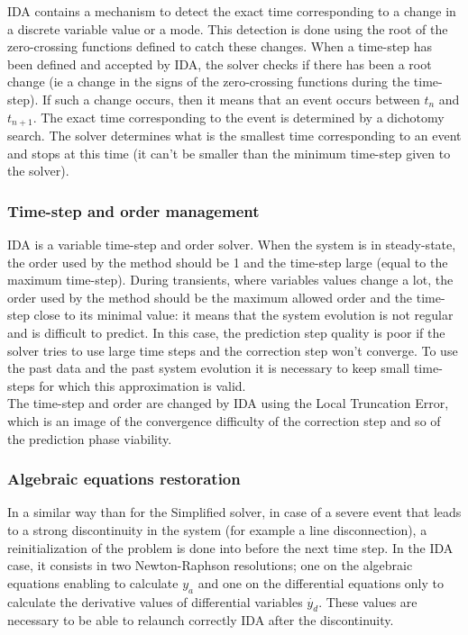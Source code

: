\documentclass[a4paper, 12pt]{report}
\begin{document}
\ac{IDA} contains a mechanism to detect the exact time corresponding to a change in a discrete variable value or a mode. This detection is done using the root of the zero-crossing functions defined to catch these changes.
When a time-step has been defined and accepted by \ac{IDA}, the solver checks if there has been a root change (ie a change in the signs of the zero-crossing functions during the time-step). If such a change occurs, then it means that an event occurs between $t_{n}$ and $t_{n+1}$. The exact time corresponding to the event is determined by a dichotomy search.
The solver determines what is the smallest time corresponding to an event and stops at this time (it can't be smaller than the minimum time-step given to the solver).

\subsubsection{Time-step and order management}

\ac{IDA} is a variable time-step and order solver. When the system is in steady-state, the order used by the method should be 1 and the time-step large (equal to the maximum time-step). During transients, where variables values change a lot, the order used by the method should be the maximum allowed order and the time-step close to its minimal value: it means that the system evolution is not regular and is difficult to predict. In this case, the prediction step quality is poor if the solver tries to use large time steps and the correction step won't converge. To use the past data and the past system evolution it is necessary to keep small time-steps for which this approximation is valid. \\

The time-step and order are changed by \ac{IDA} using the Local Truncation Error, which is an image of the convergence difficulty of the correction step and so of the prediction phase viability.

\subsubsection{Algebraic equations restoration}

In a similar way than for the Simplified solver, in case of a severe event that leads to a strong discontinuity in the system (for example a line disconnection), a reinitialization of the problem is done into \Dynawo before the next time step.
In the \ac{IDA} case, it consists in two Newton-Raphson resolutions; one on the algebraic equations enabling to calculate $y_a$ and one on the differential equations only to calculate the derivative values of differential variables $\dot{y_d}$. These values are necessary to be able to relaunch correctly \ac{IDA} after the discontinuity.
\end{document}
